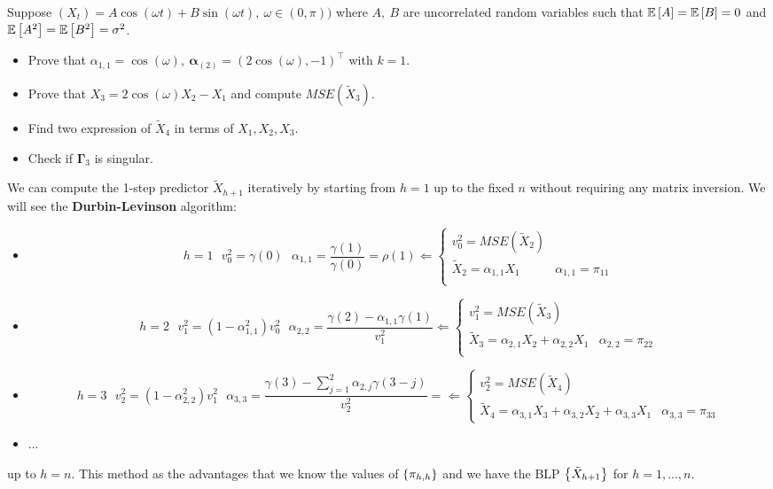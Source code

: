 \begin{exercise}
    Suppose $(X_t)=A\cos(\omega t)+B\sin(\omega t),\ \omega\in(0,\pi))$ where $A,\ B$ are uncorrelated random variables such that $\mathbb{E}\left[A\right]=\mathbb{E}\left[B\right]=0$ and $\mathbb{E}\left[A^2\right]=\mathbb{E}\left[B^2\right]=\sigma^2$.
    \begin{itemize}
        \item Prove that $\alpha_{1,1}=\cos(\omega),\ \boldsymbol{\alpha}_{(2)}=(2\cos(\omega),-1)^\intercal$ with $k=1$.
        \item Prove that $X_3=2\cos(\omega)X_2-X_1$ and compute $MSE(\tilde{X}_3)$.
        \item Find two expression of $\tilde{X}_4$ in terms of $X_1,X_2,X_3$.
        \item Check if $\boldsymbol{\Gamma}_3$ is singular. 
    \end{itemize}
\end{exercise}

We can compute the 1-step predictor $\tilde{X}_{h+1}$ iteratively by starting from $h=1$ up to the fixed $n$ without requiring any matrix inversion. We will see the \textbf{Durbin-Levinson} algorithm:
\begin{itemize}
    \item 
    \[
        h=1\ \ \ v_0^2=\gamma(0)\ \ \ \alpha_{1,1}=\frac{\gamma(1)}{\gamma(0)}=\rho(1)\Leftarrow
        \begin{cases}
            v_0^2=MSE(\tilde{X}_2)\\
            \tilde{X}_2=\alpha_{1,1}X_1&\alpha_{1,1}=\pi_{11}\\
        \end{cases} 
    \]
    \item 
    \[
        h=2\ \ \ v_1^2=(1-\alpha_{1,1}^2)v_0^2\ \ \ \alpha_{2,2}=\frac{\gamma(2)-\alpha_{1,1}\gamma(1)}{v_1^2}\Leftarrow
        \begin{cases}
            v_1^2=MSE(\tilde{X}_3)\\
            \tilde{X}_3=\alpha_{2,1}X_2+\alpha_{2,2}X_1&\alpha_{2,2}=\pi_{22}\\
        \end{cases} 
    \]
    \item 
    \[
        h=3\ \ \ v_2^2=(1-\alpha_{2,2}^2)v_1^2\ \ \ \alpha_{3,3}=\frac{\gamma(3)-\sum_{j=1}^2\alpha_{2,j}\gamma(3-j)}{v_2^2}=\Leftarrow
        \begin{cases}
            v_2^2=MSE(\tilde{X}_4)\\
            \tilde{X}_4=\alpha_{3,1}X_3+\alpha_{3,2}X_2+\alpha_{3,3}X_1&\alpha_{3,3}=\pi_{33}
        \end{cases} 
    \]
    \item ...
\end{itemize}
up to $h=n$. This method as the advantages that we know the values of $\left\{\pi_{h,h}\right\}$ and we have the BLP $\left\{\tilde{X}_{h+1}\right\}$ for $h=1,...,n$.

